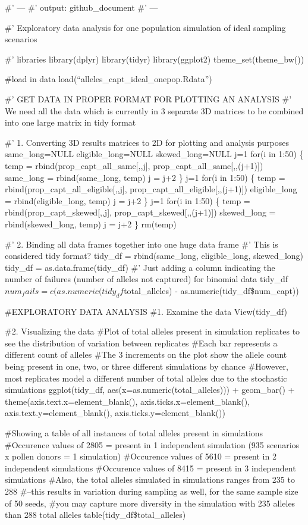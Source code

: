 \documentclass[
]{article}
\author{}
\date{\vspace{-2.5em}}
\begin{document}
\#' --- \#' output: github\_document \#' ---

\#' Exploratory data analysis for one population simulation of ideal
sampling scenarios

\#' libraries library(dplyr) library(tidyr) library(ggplot2)
theme\_set(theme\_bw())

\#load in data load(``alleles\_capt\_ideal\_onepop.Rdata'')

\#' GET DATA IN PROPER FORMAT FOR PLOTTING AN ANALYSIS \#' We need all
the data which is currently in 3 separate 3D matrices to be combined
into one large matrix in tidy format

\#' 1. Converting 3D results matrices to 2D for plotting and analysis
purposes same\_long=NULL eligible\_long=NULL skewed\_long=NULL j=1 for(i
in 1:50) \{ temp = rbind(prop\_capt\_all\_same{[},,j{]},
prop\_capt\_all\_same{[},,(j+1){]}) same\_long = rbind(same\_long, temp)
j = j+2 \} j=1 for(i in 1:50) \{ temp =
rbind(prop\_capt\_all\_eligible{[},,j{]},
prop\_capt\_all\_eligible{[},,(j+1){]}) eligible\_long =
rbind(eligible\_long, temp) j = j+2 \} j=1 for(i in 1:50) \{ temp =
rbind(prop\_capt\_skewed{[},,j{]}, prop\_capt\_skewed{[},,(j+1){]})
skewed\_long = rbind(skewed\_long, temp) j = j+2 \} rm(temp)

\#' 2. Binding all data frames together into one huge data frame \#'
This is considered tidy format? tidy\_df = rbind(same\_long,
eligible\_long, skewed\_long) tidy\_df = as.data.frame(tidy\_df) \#'
Just adding a column indicating the number of failures (number of
alleles not captured) for binomial data
tidy\_df\(num_fails = c(as.numeric(tidy_df\)total\_alleles) -
as.numeric(tidy\_df\$num\_capt))

\#EXPLORATORY DATA ANALYSIS \#1. Examine the data View(tidy\_df)

\#2. Visualizing the data \#Plot of total alleles present in simulation
replicates to see the distribution of variation between replicates
\#Each bar represents a different count of alleles \#The 3 increments on
the plot show the allele count being present in one, two, or three
different simulations by chance \#However, most replicates model a
different number of total alleles due to the stochastic simulations
ggplot(tidy\_df, aes(x=as.numeric(total\_alleles))) + geom\_bar() +
theme(axis.text.x=element\_blank(), axis.ticks.x=element\_blank(),
axis.text.y=element\_blank(), axis.ticks.y=element\_blank())

\#Showing a table of all instances of total alleles present in
simulations \#Occurence values of 2805 = present in 1 independent
simulation (935 scenarios x pollen donors = 1 simulation) \#Occurence
values of 5610 = present in 2 independent simulations \#Occurence values
of 8415 = present in 3 independent simulations \#Also, the total alleles
simulated in simulations ranges from 235 to 288 \#--this results in
variation during sampling as well, for the same sample size of 50 seeds,
\#you may capture more diversity in the simulation with 235 alleles than
288 total alleles table(tidy\_df\$total\_alleles)
\end{document}
